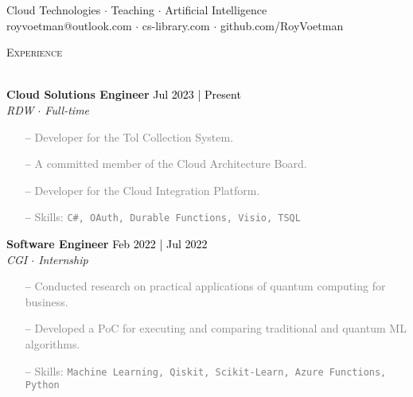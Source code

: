 \documentclass[a4paper]{article}
\newcommand{\lineunder} {
    \vspace*{-8pt} \\
    \hspace*{-18pt} \hrulefill \\
}
\newcommand{\header} [1] {
    {\hspace*{-18pt}\vspace*{6pt} \textsc{#1}}
    \vspace*{-6pt} \lineunder
}
\newcommand{\roundpic}[4][]{
  \tikz\node [circle, minimum width = #2,
    path picture = {
      \node [#1] at (path picture bounding box.center) {
        \texttt{[image: \#4]}};
    }] {};}
\begin{document}
\vspace*{-40pt}

    

\vspace*{-10pt}

\vspace{10mm}

\begin{center}
    \centering
    \raisebox{-0.5\height}{\roundpic{2.5cm}{2.5cm}{avatar1.jpeg}}
    \hspace*{.1in}
    
    \vspace*{10pt}
    {Cloud Technologies $\cdot$ Teaching $\cdot$ Artificial Intelligence}\\
    \vspace*{3pt}
	royvoetman@outlook.com $\cdot$ cs-library.com $\cdot$ github.com/RoyVoetman\\
\end{center}

\vspace{5mm}

\header{Experience}
\vspace{1mm}

\textbf{Cloud Solutions Engineer} \hfill \textcolor{black}{Jul 2023 | Present}\\
\textit{RDW $\cdot$ Full-time}\\
\begin{itemize} \itemsep 1pt
    \item[--] \textcolor{gray}{Developer for the Tol Collection System.}
    \item[--] \textcolor{gray}{A committed member of the Cloud Architecture Board.}
    \item[--] \textcolor{gray}{Developer for the Cloud Integration Platform.}
    \item[--] \textcolor{gray}{Skills: \texttt{C\#, OAuth, Durable Functions, Visio, TSQL}}
\end{itemize}

\textbf{Software Engineer} \hfill \textcolor{black}{Feb 2022 | Jul 2022}\\
\textit{CGI $\cdot$ Internship}\\
\vspace{-1mm}
\begin{itemize} \itemsep 1pt
    \item[--] \textcolor{gray}{Conducted research on practical applications of quantum computing for business.}
    \item[--] \textcolor{gray}{Developed a PoC for executing and comparing traditional and quantum ML algorithms.}
    \item[--] \textcolor{gray}{Skills: \texttt{Machine Learning, Qiskit, Scikit-Learn, Azure Functions, Python}}
\end{itemize}
\end{document}
